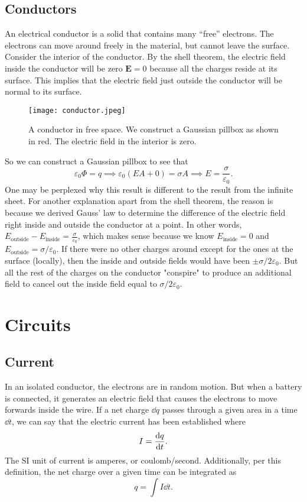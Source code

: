 \documentclass[12pt]{article}
\let\vec\mathbf
\begin{document}
  \subsection{Conductors}
  An electrical conductor is a solid that contains many “free” electrons. The electrons can move around freely in the material, but cannot leave the surface. Consider the interior of the conductor. By the shell theorem, the electric field inside the conductor will be zero $\vec E = 0$ because all the charges reside at its surface. This implies that the electric field just outside the conductor will be normal to its surface. 
    \begin{figure}[H]
  \centering
      \texttt{[image: conductor.jpeg]}
      \caption{A conductor in free space. We construct a Gaussian pillbox as shown in red. The electric field in the interior is zero.}
  \end{figure}
  So we can construct a Gaussian pillbox to see that 
  \[\varepsilon_0 \Phi = q\implies \varepsilon_0 (EA + 0)= \sigma A\implies E = \frac{\sigma}{\varepsilon_0}.\]
  One may be perplexed why this result is different to the result from the infinite sheet. For another explanation apart from the shell theorem, the reason is because we derived Gauss' law to determine the difference of the electric field right inside and outside the conductor at a point. In other words, $E_{\text{outside}} - E_{\text{inside}} = \frac{\sigma}{\varepsilon_0}$, which makes sense because we know $E_{\text{inside}} = 0$ and $E_{\text{outside}} = \sigma/\varepsilon_0$. If there were no other charges around except for the ones at the surface (locally), then the inside and outside fields would have been $\pm \sigma/2\varepsilon_0$. But all the rest of the charges on the conductor "conspire" to produce an additional field to cancel out the inside field equal to $\sigma/2\varepsilon_0$. 
  \newpage 
  \section{Circuits}
  \subsection{Current}
  In an isolated conductor, the electrons are in random motion. But when a battery is connected, it generates an electric field that causes the electrons to move forwards inside the wire. If a net charge $\dd q$ passes through a given area in a time $\dd t$, we can say that the electric current has been established where 
  \[I = \dv{q}{t}.\]
  The SI unit of current is amperes, or coulomb/second. Additionally, per this definition, the net charge over a given time can be integrated as 
  \[q = \int I \dd t.\]
\end{document}
